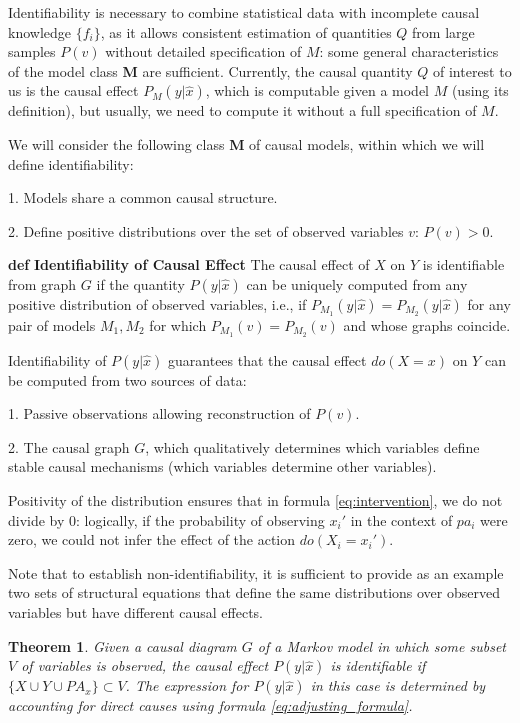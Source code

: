 \documentclass[fleqn]{article}
\def\define#1{\textbf{def} \textbf{#1}}
\newtheorem{theorem}{Theorem}
\numberwithin{equation}{section}
\numberwithin{theorem}{section}
\numberwithin{figure}{section}
\numberwithin{lemma}{section}
\numberwithin{corollary}{section}
\begin{document}
Identifiability is necessary to combine statistical data with incomplete causal knowledge $\{f_i\}$, as it allows consistent estimation of quantities $Q$ from large samples $P(v)$ without detailed specification of $M$: some general characteristics of the model class \textbf{M} are sufficient. Currently, the causal quantity $Q$ of interest to us is the causal effect $P_M(y | \hat x)$, which is computable given a model $M$ (using its definition), but usually, we need to compute it without a full specification of $M$.

We will consider the following class \textbf{M} of causal models, within which we will define identifiability:

1. Models share a common causal structure.

2. Define positive distributions over the set of observed variables $v$: $P(v) > 0$.

\define{Identifiability of Causal Effect} The causal effect of $X$ on $Y$ is identifiable from graph $G$ if the quantity $P(y|\hat x)$ can be uniquely computed from any positive distribution of observed variables, i.e., if $P_{M_1}(y|\hat x) = P_{M_2}(y|\hat x)$ for any pair of models $M_1, M_2$ for which $P_{M_1}(v) = P_{M_2}(v)$ and whose graphs coincide.

Identifiability of $P(y|\hat x)$ guarantees that the causal effect $do(X = x)$ on $Y$ can be computed from two sources of data:

1. Passive observations allowing reconstruction of $P(v)$.

2. The causal graph $G$, which qualitatively determines which variables define stable causal mechanisms (which variables determine other variables).

Positivity of the distribution ensures that in formula \ref{eq:intervention}, we do not divide by 0: logically, if the probability of observing $x_i'$ in the context of $pa_i$ were zero, we could not infer the effect of the action $do(X_i=x_i')$.

Note that to establish non-identifiability, it is sufficient to provide as an example two sets of structural equations that define the same distributions over observed variables but have different causal effects.

\begin{theorem}
	Given a causal diagram $G$ of a Markov model in which some subset $V$ of variables is observed, the causal effect $P(y|\hat x)$ is identifiable if $\{X \cup Y \cup PA_x\} \subset V$. The expression for $P(y|\hat x)$ in this case is determined by accounting for direct causes using formula \ref{eq:adjusting_formula}.
\end{theorem}
\end{document}
